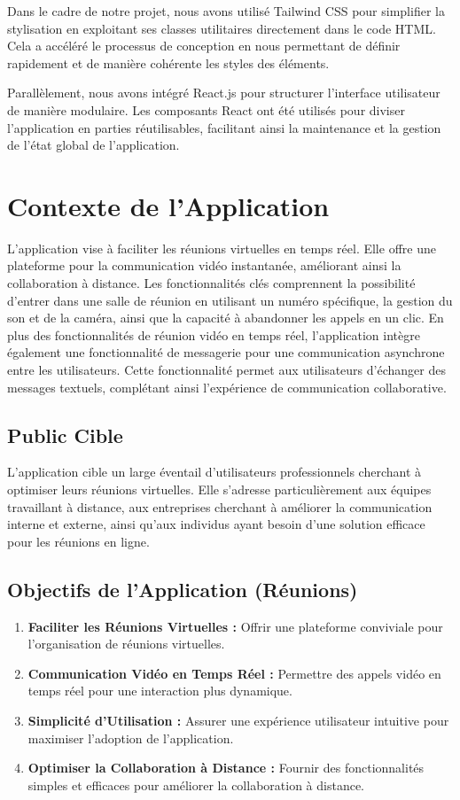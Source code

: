 \documentclass[12pt, a4paper, oneside]{Thesis}
\begin{document}
Dans le cadre de notre projet, nous avons utilisé Tailwind CSS pour simplifier la stylisation en exploitant ses classes utilitaires directement dans le code HTML. Cela a accéléré le processus de conception en nous permettant de définir rapidement et de manière cohérente les styles des éléments.

Parallèlement, nous avons intégré React.js pour structurer l'interface utilisateur de manière modulaire. Les composants React ont été utilisés pour diviser l'application en parties réutilisables, facilitant ainsi la maintenance et la gestion de l'état global de l'application.

\section{Contexte de l'Application}
L'application vise à faciliter les réunions virtuelles en temps réel. Elle offre une plateforme pour la communication vidéo instantanée, améliorant ainsi la collaboration à distance. Les fonctionnalités clés comprennent la possibilité d'entrer dans une salle de réunion en utilisant un numéro spécifique, la gestion du son et de la caméra, ainsi que la capacité à abandonner les appels en un clic.
En plus des fonctionnalités de réunion vidéo en temps réel, l'application intègre également une fonctionnalité de messagerie pour une communication asynchrone entre les utilisateurs. Cette fonctionnalité permet aux utilisateurs d'échanger des messages textuels, complétant ainsi l'expérience de communication collaborative.

\subsection{Public Cible}
L'application cible un large éventail d'utilisateurs professionnels cherchant à optimiser leurs réunions virtuelles. Elle s'adresse particulièrement aux équipes travaillant à distance, aux entreprises cherchant à améliorer la communication interne et externe, ainsi qu'aux individus ayant besoin d'une solution efficace pour les réunions en ligne.

\subsection{Objectifs de l'Application (Réunions)}
\begin{enumerate}
    \item \textbf{Faciliter les Réunions Virtuelles :} Offrir une plateforme conviviale pour l'organisation de réunions virtuelles.
    \item \textbf{Communication Vidéo en Temps Réel :} Permettre des appels vidéo en temps réel pour une interaction plus dynamique.
    \item \textbf{Simplicité d'Utilisation :} Assurer une expérience utilisateur intuitive pour maximiser l'adoption de l'application.
    \item \textbf{Optimiser la Collaboration à Distance :} Fournir des fonctionnalités simples et efficaces pour améliorer la collaboration à distance.
\end{enumerate}
\end{document}
